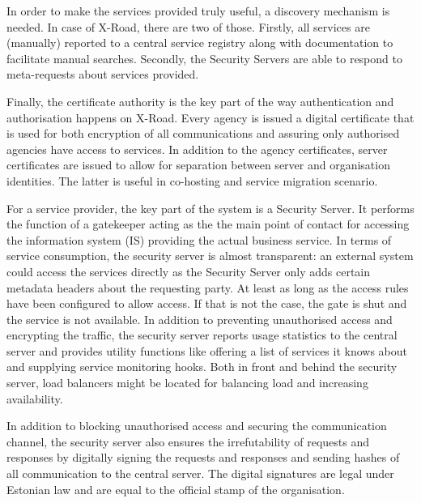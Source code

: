 \documentclass[10pt,a4paper]{article}
\begin{document}
\begin{appendices}
In order to make the services provided truly useful, a discovery mechanism is needed. In case of X-Road, there are two of those. Firstly, all services are (manually) reported to a central service registry along with documentation to facilitate manual searches. Secondly, the Security Servers are able to respond to meta-requests about services provided. 

Finally, the certificate authority is the key part of the way authentication and authorisation happens on X-Road. Every agency is issued a digital certificate that is used for both encryption of all communications and assuring only authorised agencies have access to services. In addition to the agency certificates, server certificates are issued to allow for separation between server and organisation identities. The latter is useful in co-hosting and service migration scenario.

For a service provider, the key part of the system is a Security Server. It performs the function of a gatekeeper acting as the the main point of contact for accessing the information system (IS) providing the actual business service. In terms of service consumption, the security server is almost transparent: an external system could access the services directly as the Security Server only adds certain metadata headers about the requesting party. At least as long as the access rules have been configured to allow access. If that is not the case, the gate is shut and the service is not available. In addition to preventing unauthorised access and encrypting the traffic, the security server reports usage statistics to the central server and provides utility functions like offering a list of services it knows about and supplying service monitoring hooks. Both in front and behind the security server, load balancers might be located for balancing load and increasing availability. 

In addition to blocking unauthorised access and securing the communication channel, the security server also ensures the irrefutability of requests and responses by digitally signing the requests and responses and sending hashes of all communication to the central server. The digital signatures are legal under Estonian law and are equal to the official stamp of the organisation.


\end{appendices}
\end{document}
